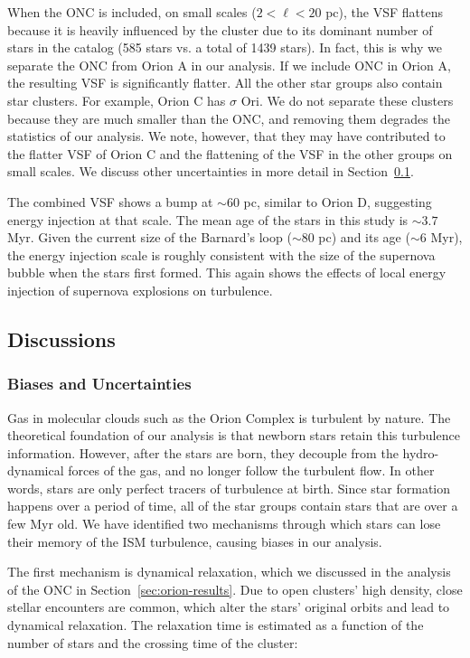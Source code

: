 When the ONC is included, on small scales ($2<\ell<20$ pc), the VSF flattens because it is heavily influenced by the cluster due to its dominant number of stars in the catalog (585 stars vs. a total of 1439 stars). In fact, this is why we separate the ONC from Orion A in our analysis. If we include ONC in Orion A, the resulting VSF is significantly flatter. All the other star groups also contain star clusters. For example, Orion C has $\sigma$ Ori. We do not separate these clusters because they are much smaller than the ONC, and removing them degrades the statistics of our analysis. We note, however, that they may have contributed to the flatter VSF of Orion C and the flattening of the VSF in the other groups on small scales. We discuss other uncertainties in more detail in Section~\ref{sec:discussions}. 

The combined VSF shows a bump at $\sim 60$ pc, similar to Orion D, suggesting energy injection at that scale. The mean age of the stars in this study is $\sim 3.7$ Myr. Given the current size of the Barnard's loop ($\sim 80$ pc) and its age ($\sim 6$ Myr), the energy injection scale is roughly consistent with the size of the supernova bubble when the stars first formed. This again shows the effects of local energy injection of supernova explosions on turbulence.



\subsection{Discussions}\label{sec:discussions}

\subsubsection{Biases and Uncertainties}

Gas in molecular clouds such as the Orion Complex is turbulent by nature. The theoretical foundation of our analysis is that newborn stars retain this turbulence information. However, after the stars are born, they decouple from the hydro-dynamical forces of the gas, and no longer follow the turbulent flow. In other words, stars are only perfect tracers of turbulence at birth. Since star formation happens over a period of time, all of the star groups contain stars that are over a few Myr old. We have identified two mechanisms through which stars can lose their memory of the ISM turbulence, causing biases in our analysis.

The first mechanism is dynamical relaxation, which we discussed in the analysis of the ONC in Section~\ref{sec:orion-results}. Due to open clusters' high density, close stellar encounters are common, which alter the stars' original orbits and lead to dynamical relaxation. The relaxation time is estimated as a function of the number of stars and the crossing time of the cluster:

